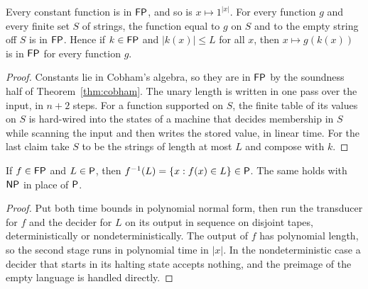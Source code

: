 \begin{lemma}
  \label{lem:polytime-FP-basic}
  \leanok
  Every constant function is in $\mathsf{FP}$, and so is $x \mapsto 1^{|x|}$. For
  every function $g$ and every finite set $S$ of strings, the function equal
  to $g$ on $S$ and to the empty string off $S$ is in $\mathsf{FP}$. Hence if
  $k \in \mathsf{FP}$ and $|k(x)| \le L$ for all $x$, then $x \mapsto g(k(x))$ is
  in $\mathsf{FP}$ for every function $g$.
\end{lemma}
\begin{proof}
  \leanok
  Constants lie in Cobham's algebra, so they are in $\mathsf{FP}$ by the soundness
  half of Theorem~\ref{thm:cobham}. The unary length is written in one pass
  over the input, in $n + 2$ steps. For a function supported on $S$, the finite
  table of its values on $S$ is hard-wired into the states of a machine that
  decides membership in $S$ while scanning the input and then writes the
  stored value, in linear time. For the last claim take $S$ to be the strings
  of length at most $L$ and compose with $k$.
\end{proof}

\begin{theorem}
  \label{thm:polytime-preimage}
  \leanok
  If $f \in \mathsf{FP}$ and $L \in \mathsf{P}$, then
  $f^{-1}(L) = \{x : f(x) \in L\} \in \mathsf{P}$. The same holds with $\mathsf{NP}$ in
  place of $\mathsf{P}$.
\end{theorem}
\begin{proof}
  \leanok
  Put both time bounds in polynomial normal form, then run the transducer for
  $f$ and the decider for $L$ on its output in sequence on disjoint tapes,
  deterministically or nondeterministically. The output of $f$ has polynomial
  length, so the second stage runs in polynomial time in $|x|$. In the
  nondeterministic case a decider that starts in its halting state accepts
  nothing, and the preimage of the empty language is handled directly.
\end{proof}


